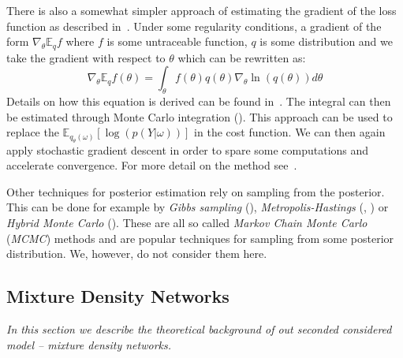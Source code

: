 \documentclass[12pt,a4paper,twoside]{scrartcl}
\numberwithin{equation}{section}
\begin{document}
There is also a somewhat simpler approach of estimating the gradient of the loss function as described in~\cite{paisley2012}. Under some regularity conditions, a gradient of the form \(\nabla_{\theta}\mathbb{E}_qf \) where \(f \) is some untraceable function, \(q\) is some distribution and we take the gradient with respect to \(\theta\) which can be rewritten as:
\begin{equation}
  \nabla_{\theta}\mathbb{E}_qf(\theta) = \int_{\theta} f(\theta)q(\theta) \nabla_{\theta}\ln(q(\theta)) d\theta
\end{equation}
Details on how this equation is derived can be found in~\cite{paisley2012}. The integral can then be estimated through Monte Carlo integration (\cite{hammersley1964}). This approach can be used to replace the \(\mathbb{E}_{q_{\theta}(\omega)}[\log(p(Y|\omega))]\) in the cost function. We can then again apply stochastic gradient descent in order to spare some computations and accelerate convergence. For more detail on the method see~\cite{paisley2012}.

Other techniques for posterior estimation rely on sampling from the posterior. This can be done for example by \emph{Gibbs sampling} (\cite{geman1984}), \emph{Metropolis-Hastings} (\cite{metropolis1953}, \cite{hastings1970}) or \emph{Hybrid Monte Carlo} (\cite{duane1987}). These are all so called \emph{Markov Chain Monte Carlo} (\emph{MCMC}) methods and are popular techniques for sampling from some posterior distribution. We, however, do not consider them here.
\subsection{Mixture Density Networks}\label{sec:mdn}
\emph{In this section we describe the theoretical background of out seconded considered model -- mixture density networks.}
\end{document}
